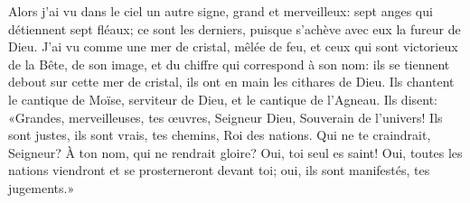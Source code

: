 Alors j’ai vu dans le ciel un autre signe, grand et merveilleux:
	sept anges qui détiennent sept fléaux;
	ce sont les derniers, puisque s’achève avec eux la fureur de Dieu.
J’ai vu comme une mer de cristal, mêlée de feu,
	et ceux qui sont victorieux de la Bête, de son image,
		et du chiffre qui correspond à son nom:
	ils se tiennent debout sur cette mer de cristal,
	ils ont en main les cithares de Dieu.
Ils chantent le cantique de Moïse, serviteur de Dieu, et le cantique de l’Agneau.
Ils disent: «Grandes, merveilleuses, tes œuvres,
	Seigneur Dieu, Souverain de l’univers!
	Ils sont justes, ils sont vrais, tes chemins, Roi des nations.
Qui ne te craindrait, Seigneur? À ton nom, qui ne rendrait gloire?
	Oui, toi seul es saint!
Oui, toutes les nations viendront et se prosterneront devant toi;
	oui, ils sont manifestés, tes jugements.»
